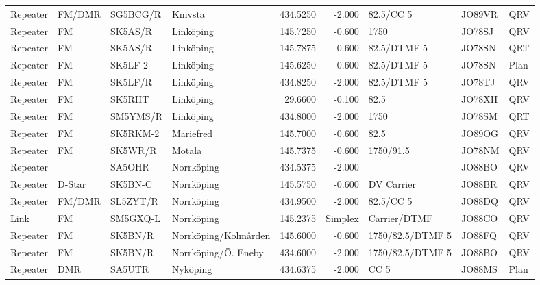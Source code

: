 \begin{landscape}
\begin{longtable}{llllrrlll}
	Repeater & FM/DMR  & SG5BCG/R & Knivsta              &     434.5250 &     -2.000 & 82.5/CC 5         & JO89VR      & QRV      \\
	Repeater & FM      & SK5AS/R  & Linköping            &     145.7250 &     -0.600 & 1750              & JO78SJ      & QRV      \\
	Repeater & FM      & SK5AS/R  & Linköping            &     145.7875 &     -0.600 & 82.5/DTMF 5       & JO78SN      & QRT      \\
	Repeater & FM      & SK5LF-2  & Linköping            &     145.6250 &     -0.600 & 82.5/DTMF 5       & JO78SN      & Plan     \\
	Repeater & FM      & SK5LF/R  & Linköping            &     434.8250 &     -2.000 & 82.5/DTMF 5       & JO78TJ      & QRV      \\
	Repeater & FM      & SK5RHT   & Linköping            &      29.6600 &     -0.100 & 82.5              & JO78XH      & QRV      \\
	Repeater & FM      & SM5YMS/R & Linköping            &     434.8000 &     -2.000 & 1750              & JO78SM      & QRT      \\
	Repeater & FM      & SK5RKM-2 & Mariefred            &     145.7000 &     -0.600 & 82.5              & JO89OG      & QRV      \\
	Repeater & FM      & SK5WR/R  & Motala               &     145.7375 &     -0.600 & 1750/91.5         & JO78NM      & QRV      \\
	Repeater &         & SA5OHR   & Norrköping           &     434.5375 &     -2.000 &                   & JO88BO      & QRV      \\
	Repeater & D-Star  & SK5BN-C  & Norrköping           &     145.5750 &     -0.600 & DV Carrier        & JO88BR      & QRV      \\
	Repeater & FM/DMR  & SL5ZYT/R & Norrköping           &     434.9500 &     -2.000 & 82.5/CC 5         & JO88DQ      & QRV      \\
	Link     & FM      & SM5GXQ-L & Norrköping           &     145.2375 &    Simplex & Carrier/DTMF      & JO88CO      & QRV      \\
	Repeater & FM      & SK5BN/R  & Norrköping/Kolmården &     145.6000 &     -0.600 & 1750/82.5/DTMF 5  & JO88FQ      & QRV      \\
	Repeater & FM      & SK5BN/R  & Norrköping/Ö. Eneby  &     434.6000 &     -2.000 & 1750/82.5/DTMF 5  & JO88BO      & QRV      \\
	Repeater & DMR     & SA5UTR   & Nyköping             &     434.6375 &     -2.000 & CC 5              & JO88MS      & Plan     \\

\end{longtable}
\end{landscape}
